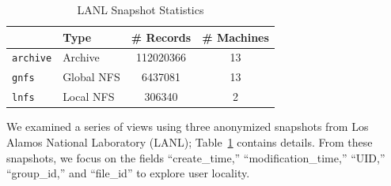 \begin{table}%
\centering
\small
\caption{LANL Snapshot Statistics}
\begin{tabular}{llcc}
\toprule
&Type&\# Records&\# Machines\\
\midrule
\texttt{archive}&Archive&112020366&13\\ 
\texttt{gnfs}&Global NFS&6437081&13\\
\texttt{lnfs}&Local NFS&306340&2\\
\bottomrule
\end{tabular}
\label{tab:datasets}
\end{table}
\normalsize

We examined a series of views using three anonymized snapshots from Los Alamos
National Laboratory (LANL); Table~\ref{tab:datasets} contains details.    
From these snapshots, we focus on the fields ``create\_time,'' ``modification\_time,''
``UID,'' ``group\_id,'' and ``file\_id'' to explore user locality.

